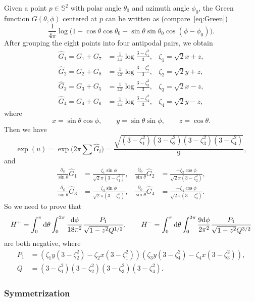 \documentclass[a4paper]{amsart}
\newcommand{\dd}{{\rm d}}
\theoremstyle{plain} %
\theoremstyle{definition} %
\theoremstyle{remark}
\begin{document}
Given a point $p \in \mathbb{S}^2$ with polar angle $\theta_0$ and azimuth
angle $\phi_0$, the Green function $G(\theta,\phi)$ centered at $p$ can be
written as (compare~\eqref{eq:Green})
\[
	\frac{1}{4\pi} \log \big(1 - \cos\theta \cos\theta_0 - \sin\theta \sin\theta_0 \cos(\phi-\phi_0)\big).
\]
After grouping the eight points into four antipodal pairs, we obtain
\begin{align*}
	\widehat G_1 = G_1+G_7 &= \frac{1}{4\pi}\log\frac{3-\zeta_1^2}{3},& \zeta_1 = \sqrt{2} x + z,\\
	\widehat G_2 = G_2+G_8 &= \frac{1}{4\pi}\log\frac{3-\zeta_2^2}{3},& \zeta_2 = \sqrt{2} y + z,\\
	\widehat G_3 = G_3+G_5 &= \frac{1}{4\pi}\log\frac{3-\zeta_3^2}{3},& \zeta_3 = \sqrt{2} x - z,\\
	\widehat G_4 = G_4+G_6 &= \frac{1}{4\pi}\log\frac{3-\zeta_4^2}{3},& \zeta_4 = \sqrt{2} y - z,
\end{align*}
where
\[
	x = \sin\theta\cos\phi, \qquad
	y = \sin\theta\sin\phi, \qquad
	z = \cos\theta.
\]
Then we have
\[
	\exp(u) = \exp\Big(2\pi\sum \widehat G_i\Big)
	= \frac{\sqrt{(3-\zeta_1^2)(3-\zeta_2^2)(3-\zeta_3^2)(3-\zeta_4^2)}}{9},
\]
and
\begin{align*}
	\frac{\partial_\phi}{\sin\theta} \widehat G_1 &= \frac{\zeta_1 \sin\phi}{\sqrt{2}\pi(3 - \zeta_1^2)}, &
	\frac{\partial_\phi}{\sin\theta} \widehat G_2 &= \frac{-\zeta_2 \cos\phi}{\sqrt{2}\pi(3 - \zeta_2^2)}, \\
	\frac{\partial_\phi}{\sin\theta} \widehat G_3 &= \frac{\zeta_3 \sin\phi}{\sqrt{2}\pi(3 - \zeta_3^2)}, &
	\frac{\partial_\phi}{\sin\theta} \widehat G_4 &= \frac{-\zeta_4 \cos\phi}{\sqrt{2}\pi(3 - \zeta_4^2)}.
\end{align*}
So we need to prove that
\[
	H^+ = \int_0^\pi \dd\theta \int_0^{2\pi}
	\frac{\dd\phi}{18\pi^2} \frac{P_1}{\sqrt{1-z^2} Q^{1/2}},\qquad
	H^- = \int_0^\pi \dd\theta \int_0^{2\pi}
	\frac{9 \dd\phi}{2\pi^2} \frac{P_1}{\sqrt{1-z^2} Q^{3/2}}
\]
are both negative, where
\begin{align*}
	P_1 &= (\zeta_1y(3-\zeta_2^2) - \zeta_2x(3-\zeta_1^2))(\zeta_3y(3-\zeta_4^2)-\zeta_4x(3-\zeta_3^2)),\\
	Q &= (3-\zeta_1^2)(3-\zeta_2^2)(3-\zeta_3^2)(3-\zeta_4^2).
\end{align*}

\subsubsection{Symmetrization}
\end{document}
